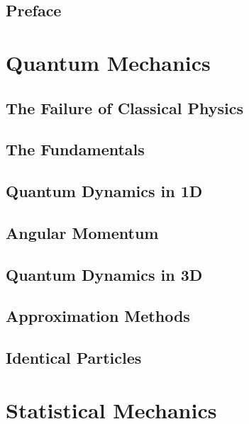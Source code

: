\documentclass[a4paper, 11pt]{book}
\newcommand{\1}{\opr{\mathds{1}}}
\begin{document}


\chapter*{Preface}
	
\tableofcontents
{}
\part{Quantum Mechanics}
	\chapter{The Failure of Classical Physics}
		
	\chapter{The Fundamentals}
		
	\chapter{Quantum Dynamics in 1D}
		
		\chapter{Angular Momentum}
		
	\chapter{Quantum Dynamics in 3D}
		
	\chapter{Approximation Methods}
		
	\chapter{Identical Particles}
		
\part{Statistical Mechanics}
		
		
		
		
\end{document}
